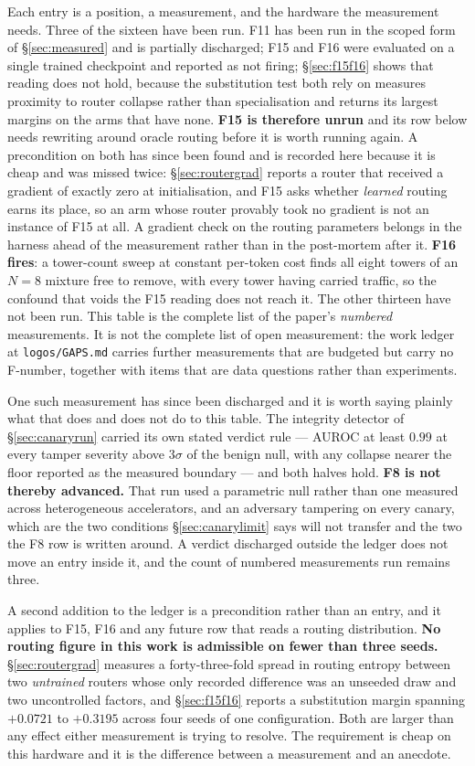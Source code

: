 \documentclass[11pt]{article}
\begin{document}
Each entry is a position, a measurement, and the hardware the measurement needs. Three of the sixteen have been run. F11 has been run in the scoped form of \S\ref{sec:measured} and is partially discharged; F15 and F16 were evaluated on a single trained checkpoint and reported as not firing; \S\ref{sec:f15f16} shows that reading does not hold, because the substitution test both rely on measures proximity to router collapse rather than specialisation and returns its largest margins on the arms that have none. \textbf{F15 is therefore unrun} and its row below needs rewriting around oracle routing before it is worth running again. A precondition on both has since been found and is recorded here because it is cheap and was missed twice: \S\ref{sec:routergrad} reports a router that received a gradient of exactly zero at initialisation, and F15 asks whether \emph{learned} routing earns its place, so an arm whose router provably took no gradient is not an instance of F15 at all. A gradient check on the routing parameters belongs in the harness ahead of the measurement rather than in the post-mortem after it. \textbf{F16 fires}: a tower-count sweep at constant per-token cost finds all eight towers of an $N=8$ mixture free to remove, with every tower having carried traffic, so the confound that voids the F15 reading does not reach it. The other thirteen have not been run. This table is the complete list of the paper's \emph{numbered} measurements. It is not the complete list of open measurement: the work ledger at \texttt{logos/GAPS.md} carries further measurements that are budgeted but carry no F-number, together with items that are data questions rather than experiments.

One such measurement has since been discharged and it is worth saying plainly what that does and does not do to this table. The integrity detector of \S\ref{sec:canaryrun} carried its own stated verdict rule --- AUROC at least $0.99$ at every tamper severity above $3\sigma$ of the benign null, with any collapse nearer the floor reported as the measured boundary --- and both halves hold. \textbf{F8 is not thereby advanced.} That run used a parametric null rather than one measured across heterogeneous accelerators, and an adversary tampering on every canary, which are the two conditions \S\ref{sec:canarylimit} says will not transfer and the two the F8 row is written around. A verdict discharged outside the ledger does not move an entry inside it, and the count of numbered measurements run remains three.

A second addition to the ledger is a precondition rather than an entry, and it applies to F15, F16 and any future row that reads a routing distribution. \textbf{No routing figure in this work is admissible on fewer than three seeds.} \S\ref{sec:routergrad} measures a forty-three-fold spread in routing entropy between two \emph{untrained} routers whose only recorded difference was an unseeded draw and two uncontrolled factors, and \S\ref{sec:f15f16} reports a substitution margin spanning $+0.0721$ to $+0.3195$ across four seeds of one configuration. Both are larger than any effect either measurement is trying to resolve. The requirement is cheap on this hardware and it is the difference between a measurement and an anecdote.
\end{document}
